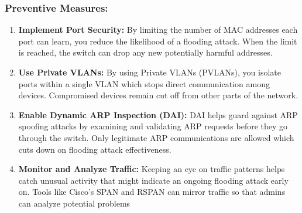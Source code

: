 \documentclass[11pt,a4paper]{article}
\begin{document}
\subsubsection*{Preventive Measures:}
    \begin{enumerate}
        \item \textbf{Implement Port Security:} By limiting the number of MAC addresses each port can learn, you reduce the likelihood of a flooding attack. When the limit is reached, the switch can drop any new potentially harmful addresses.
        \item \textbf{Use Private VLANs:} By using Private VLANs (PVLANs), you isolate ports within a single VLAN which stops direct communication among devices. Compromised devices remain cut off from other parts of the network.
        \item \textbf{Enable Dynamic ARP Inspection (DAI):} DAI helps guard against ARP spoofing attacks by examining and validating ARP requests before they go through the switch. Only legitimate ARP communications are allowed which cuts down on flooding attack effectiveness.
        \item \textbf{Monitor and Analyze Traffic:} Keeping an eye on traffic patterns helps catch unusual activity that might indicate an ongoing flooding attack early on. Tools like Cisco's SPAN and RSPAN can mirror traffic so that admins can analyze potential problems 
    \end{enumerate}
\end{document}
